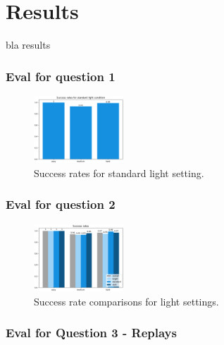 \chapter{Results}
\label{cha:Reults}

bla results

\subsection{Eval for question 1}

\begin{figure}
    \centering
    \includegraphics[width=0.3\textwidth]{Bilder/latex_images/from_notebook/success_trainedHardStandardDistanceRewardEval_standard_success_rates_barplot.png}
    \caption{Success rates for standard light setting.}
    \label{fig:result_success_rates_standard}
\end{figure} %

\subsection{Eval for question 2}

\begin{figure}
    \centering
    \includegraphics[width=0.3\textwidth]{Bilder/latex_images/from_notebook/success_trainedHardStandardDistanceRewardEval_all_success_rates_barplot.png}
    \caption{Success rate comparisons for light settings.}
    \label{fig:result_success_rates_lightSettings}
\end{figure} %


\subsection{Eval for Question 3 - Replays}